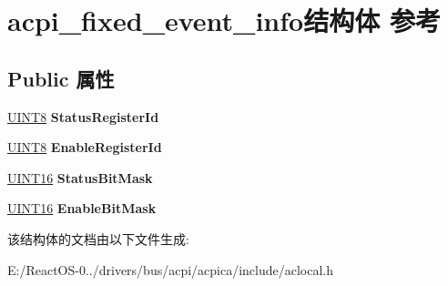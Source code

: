 \hypertarget{structacpi__fixed__event__info}{}\section{acpi\+\_\+fixed\+\_\+event\+\_\+info结构体 参考}
\label{structacpi__fixed__event__info}
\subsection*{Public 属性}
\begin{DoxyCompactItemize}
\item 
\mbox{\label{structacpi__fixed__event__info_a2a615d11e584234514408ed86e8f98d9}} 
\hyperlink{_processor_bind_8h_ab27e9918b538ce9d8ca692479b375b6a}{U\+I\+N\+T8} {\bfseries Status\+Register\+Id}
\item 
\mbox{\label{structacpi__fixed__event__info_a13dd0e549f83885a03c39995d3d220b5}} 
\hyperlink{_processor_bind_8h_ab27e9918b538ce9d8ca692479b375b6a}{U\+I\+N\+T8} {\bfseries Enable\+Register\+Id}
\item 
\mbox{\label{structacpi__fixed__event__info_a6ae28a857c82943b129165318f7c9fc0}} 
\hyperlink{_processor_bind_8h_a09f1a1fb2293e33483cc8d44aefb1eb1}{U\+I\+N\+T16} {\bfseries Status\+Bit\+Mask}
\item 
\mbox{\label{structacpi__fixed__event__info_a24fe3e172ab318832214b2b2ebab5df3}} 
\hyperlink{_processor_bind_8h_a09f1a1fb2293e33483cc8d44aefb1eb1}{U\+I\+N\+T16} {\bfseries Enable\+Bit\+Mask}
\end{DoxyCompactItemize}


该结构体的文档由以下文件生成\+:\begin{DoxyCompactItemize}
\item 
E\+:/\+React\+O\+S-\/0../drivers/bus/acpi/acpica/include/aclocal.\+h\end{DoxyCompactItemize}
